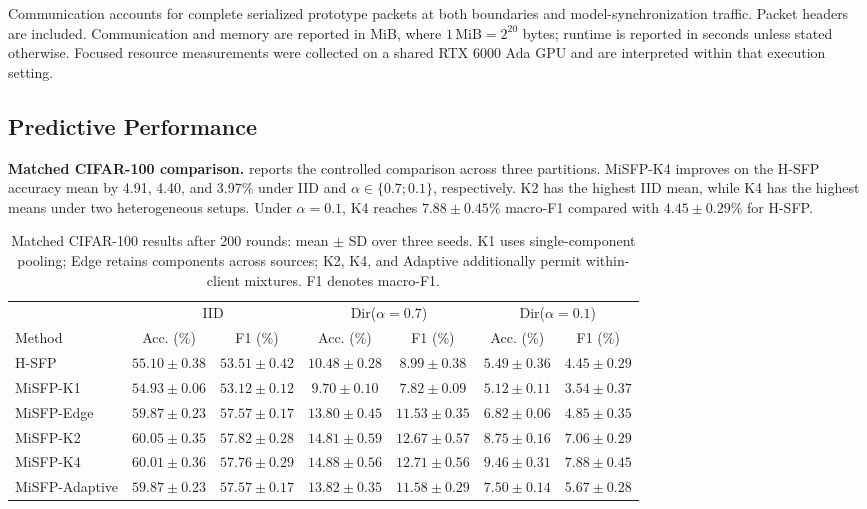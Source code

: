 Communication accounts for complete serialized prototype packets at both boundaries and model-synchronization traffic. Packet headers are included. Communication and memory are reported in MiB, where $1\,\mathrm{MiB}=2^{20}$ bytes; runtime is reported in seconds unless stated otherwise. Focused resource measurements were collected on a shared RTX 6000 Ada GPU and are interpreted within that execution setting.

\subsection{Predictive Performance}
\label{sec:results}

\noindent\textbf{Matched CIFAR-100 comparison.}  reports the controlled comparison across three partitions. MiSFP-K4 improves on the H-SFP accuracy mean by 4.91, 4.40, and 3.97\% under IID and $\alpha\in\{0.7;0.1\}$, respectively. K2 has the highest IID mean, while K4 has the highest means under two heterogeneous setups. Under $\alpha=0.1$, K4 reaches $7.88\pm0.45\%$ macro-F1 compared with $4.45\pm0.29\%$ for H-SFP.

\begin{table}[t]
\caption{Matched CIFAR-100 results after 200 rounds: mean $\pm$ SD over three seeds. K1 uses single-component pooling; Edge retains components across sources; K2, K4, and Adaptive additionally permit within-client mixtures. F1 denotes macro-F1.}
\label{tab:main}
\centering
\footnotesize
\setlength{\tabcolsep}{3pt}
\begin{tabular*}{\textwidth}{@{\extracolsep{\fill}}lcccccc@{}}
\toprule
& \multicolumn{2}{c}{IID} & \multicolumn{2}{c}{Dir($\alpha=0.7$)} & \multicolumn{2}{c}{Dir($\alpha=0.1$)}\\
\cmidrule(lr){2-3}\cmidrule(lr){4-5}\cmidrule(lr){6-7}
Method & Acc. (\%) & F1 (\%) & Acc. (\%) & F1 (\%) & Acc. (\%) & F1 (\%)\\
\midrule
H-SFP & $55.10\pm0.38$ & $53.51\pm0.42$ & $10.48\pm0.28$ & $8.99\pm0.38$ & $5.49\pm0.36$ & $4.45\pm0.29$\\
MiSFP-K1 & $54.93\pm0.06$ & $53.12\pm0.12$ & $9.70\pm0.10$ & $7.82\pm0.09$ & $5.12\pm0.11$ & $3.54\pm0.37$\\
MiSFP-Edge & $59.87\pm0.23$ & $57.57\pm0.17$ & $13.80\pm0.45$ & $11.53\pm0.35$ & $6.82\pm0.06$ & $4.85\pm0.35$\\
MiSFP-K2 & $60.05\pm0.35$ & $57.82\pm0.28$ & $14.81\pm0.59$ & $12.67\pm0.57$ & $8.75\pm0.16$ & $7.06\pm0.29$\\
MiSFP-K4 & $60.01\pm0.36$ & $57.76\pm0.29$ & $14.88\pm0.56$ & $12.71\pm0.56$ & $9.46\pm0.31$ & $7.88\pm0.45$\\
MiSFP-Adaptive & $59.87\pm0.23$ & $57.57\pm0.17$ & $13.82\pm0.35$ & $11.58\pm0.29$ & $7.50\pm0.14$ & $5.67\pm0.28$\\
\bottomrule
\end{tabular*}
\end{table}

